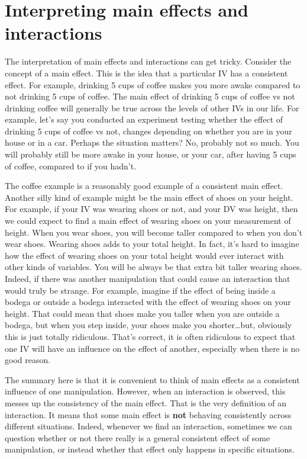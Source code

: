 \documentclass[
]{book}
\begin{document}
\hypertarget{interpreting-main-effects-and-interactions}{%
\section{Interpreting main effects and interactions}\label{interpreting-main-effects-and-interactions}}

The interpretation of main effects and interactions can get tricky. Consider the concept of a main effect. This is the idea that a particular IV has a consistent effect. For example, drinking 5 cups of coffee makes you more awake compared to not drinking 5 cups of coffee. The main effect of drinking 5 cups of coffee vs not drinking coffee will generally be true across the levels of other IVs in our life. For example, let's say you conducted an experiment testing whether the effect of drinking 5 cups of coffee vs not, changes depending on whether you are in your house or in a car. Perhaps the situation matters? No, probably not so much. You will probably still be more awake in your house, or your car, after having 5 cups of coffee, compared to if you hadn't.

The coffee example is a reasonably good example of a consistent main effect. Another silly kind of example might be the main effect of shoes on your height. For example, if your IV was wearing shoes or not, and your DV was height, then we could expect to find a main effect of wearing shoes on your measurement of height. When you wear shoes, you will become taller compared to when you don't wear shoes. Wearing shoes adds to your total height. In fact, it's hard to imagine how the effect of wearing shoes on your total height would ever interact with other kinds of variables. You will be always be that extra bit taller wearing shoes. Indeed, if there was another manipulation that could cause an interaction that would truly be strange. For example, imagine if the effect of being inside a bodega or outside a bodega interacted with the effect of wearing shoes on your height. That could mean that shoes make you taller when you are outside a bodega, but when you step inside, your shoes make you shorter\ldots but, obviously this is just totally ridiculous. That's correct, it is often ridiculous to expect that one IV will have an influence on the effect of another, especially when there is no good reason.

The summary here is that it is convenient to think of main effects as a consistent influence of one manipulation. However, when an interaction is observed, this messes up the consistency of the main effect. That is the very definition of an interaction. It means that some main effect is \textbf{not} behaving consistently across different situations. Indeed, whenever we find an interaction, sometimes we can question whether or not there really is a general consistent effect of some manipulation, or instead whether that effect only happens in specific situations.
\end{document}
